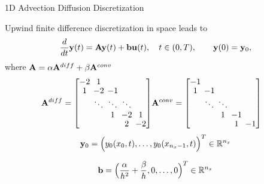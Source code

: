 \begin{frame}{1D Advection Diffusion Discretization}

Upwind finite difference discretization in space leads to
         \[
                    \frac{d}{dt} {\bf y}(t)  = {\mathbf A} {\bf y}(t) + {\bf b}{\bf u}(t), \quad t \in (0,T), \qquad {\bf y}(0) = {\bf y}_0,
        \]
        where \({\bf A} = \alpha {\mathbf A}^{diff} + \beta {\mathbf A}^{conv}\)
        \begin{align*}
              \setlength{\arraycolsep}{2pt}
              \renewcommand{\arraystretch}{0.9}
              \bA^{diff} = \begin{bmatrix}
              -2 & 1\\
              1 & -2 & -1\\
              &   \ddots & \ddots & \ddots\\
              &   &     1 & -2 & 1\\
              &&& 2 & -2
              \end{bmatrix}
        &
              \setlength{\arraycolsep}{2pt}
              \renewcommand{\arraystretch}{0.9}
              \bA^{conv} = \begin{bmatrix}
              -1\\
              1 & -1 \\
              &   \ddots & \ddots\\
              &   &     1 & -1\\
              &&& 1 & -1
              \end{bmatrix}
        \end{align*}
        \[
             {\bf y}_0 =  \Big(y_0(x_0,t), \ldots,  y_0(x_{n_x-1},t) \Big)^T \in \mathbb{R}^{n_x}             
        \]
        
        \[
             {\bf b} =  \Big( \frac{\alpha}{h^{2}}+\frac{\beta}{h},0, \ldots,0 \Big)^T \in \mathbb{R}^{n_x}             
        \]

\end{frame}



